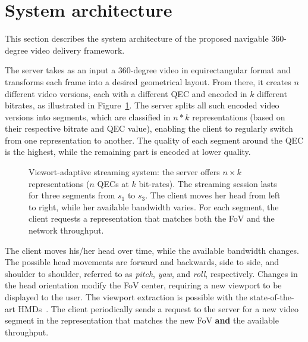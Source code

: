 \section{System architecture}

This section describes the system architecture of the proposed
navigable 360-degree video delivery framework.

 The server takes as an input a 360-degree video in
equirectangular format and transforms each frame into a desired
geometrical layout. From there, it creates $n$ different video
versions, each with a different QEC and encoded in $k$ different
bitrates, as illustrated in Figure~\ref{fig:newdelivery}. The server
splits all such encoded video versions into segments, which are
classified in $n*k$ representations (based on their respective bitrate
and QEC value), enabling the client to regularly switch from one
representation to another. The quality of each segment around the QEC
is the highest, while the remaining part is encoded at lower quality.

\begin{figure}
   \centering
   
   \caption{Viewort-adaptive streaming system: the server offers $n\times k$ representations ($n$ \acp{QEC} at $k$ bit-rates). The streaming session lasts for three segments from $s_1$ to $s_3$. The client moves her head from left to right, while her available bandwidth varies. For each segment, the client requests a representation that matches both the \ac{FoV} and the network throughput.}
   \label{fig:newdelivery}
\end{figure}

 The client moves his/her head over time, while the
available bandwidth changes. The possible head movements are forward
and backwards, side to side, and shoulder to shoulder, referred to as
\emph{pitch}, \emph{yaw}, and \emph{roll}, respectively. Changes in
the head orientation modify the FoV center, requiring a new viewport
to be displayed to the user. The viewport extraction is possible with
the state-of-the-art HMDs~\cite{fovhmds}. The client periodically
sends a request to the server for a new video segment in the
representation that matches the new FoV \textbf{and} the available
throughput.

